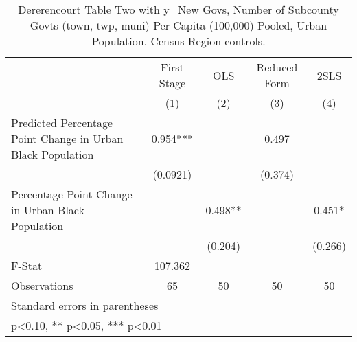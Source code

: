 \begin{table}[htbp]\centering
\def\sym#1{\ifmmode^{#1}\else\(^{#1}\)\fi}
\caption{Dererencourt Table Two with y=New Govs, Number of Subcounty Govts (town, twp, muni) Per Capita (100,000) Pooled, Urban Population, Census Region controls.}
\begin{tabular}{l*{4}{c}}
\toprule
                    & First Stage   &         OLS   &Reduced Form   &        2SLS   \\
                    &\multicolumn{1}{c}{(1)}   &\multicolumn{1}{c}{(2)}   &\multicolumn{1}{c}{(3)}   &\multicolumn{1}{c}{(4)}   \\
\midrule
Predicted Percentage Point Change in Urban Black Population&       0.954***&               &       0.497   &               \\
                    &    (0.0921)   &               &     (0.374)   &               \\
\addlinespace
Percentage Point Change in Urban Black Population&               &       0.498** &               &       0.451*  \\
                    &               &     (0.204)   &               &     (0.266)   \\
\midrule
F-Stat              &     107.362   &               &               &               \\
Observations        &          65   &          50   &          50   &          50   \\
\bottomrule
\multicolumn{5}{l}{\footnotesize Standard errors in parentheses}\\
\multicolumn{5}{l}{\footnotesize * p<0.10, ** p<0.05, *** p<0.01}\\
\end{tabular}
\end{table}

